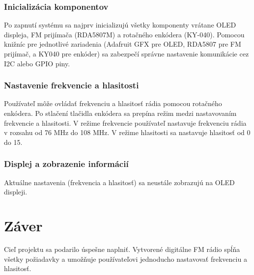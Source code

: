 \documentclass[11pt, a4paper]{article}
\begin{document}
\subsubsection{Inicializácia komponentov} Po zapnutí systému sa najprv inicializujú 
všetky komponenty vrátane OLED displeja, FM prijímača (RDA5807M) a rotačného enkódera 
(KY-040). Pomocou knižníc pre jednotlivé zariadenia (Adafruit GFX pre OLED, RDA5807 pre 
FM prijímač, a KY040 pre enkóder) sa zabezpečí správne nastavenie komunikácie cez I2C 
alebo GPIO piny.

\subsubsection{Nastavenie frekvencie a hlasitosti} 
Používateľ môže ovládať frekvenciu a hlasitosť rádia pomocou rotačného enkódera. 
Po stlačení tlačidla enkódera sa prepína režim medzi nastavovaním frekvencie a 
hlasitosti. V režime frekvencie používateľ nastavuje frekvenciu rádia v rozsahu od 
76 MHz do 108 MHz. V režime hlasitosti sa nastavuje hlasitosť od 0 do 15.

\subsubsection{Displej a zobrazenie informácií} 
Aktuálne nastavenia (frekvencia a hlasitosť) sa neustále zobrazujú na OLED displeji.

\section{Záver}
Cieľ projektu sa podarilo úspešne naplniť. Vytvorené digitálne FM rádio spĺňa všetky 
požiadavky a umožňuje používateľovi jednoducho nastavovať frekvenciu a hlasitosť.
\end{document}
